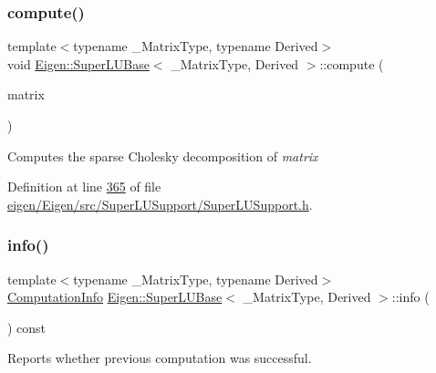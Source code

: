 \subsubsection{\texorpdfstring{compute()}{compute()}\hspace{0.1cm}{\footnotesize\ttfamily [2/2]}}
{\footnotesize\ttfamily template$<$typename \+\_\+\+Matrix\+Type, typename Derived$>$ \\
void \hyperlink{class_eigen_1_1_super_l_u_base}{Eigen\+::\+Super\+L\+U\+Base}$<$ \+\_\+\+Matrix\+Type, Derived $>$\+::compute (\begin{DoxyParamCaption}\item[{const Matrix\+Type \&}]{matrix }\end{DoxyParamCaption})\hspace{0.3cm}{\ttfamily [inline]}}

Computes the sparse Cholesky decomposition of {\itshape matrix} 

Definition at line \hyperlink{eigen_2_eigen_2src_2_super_l_u_support_2_super_l_u_support_8h_source_l00365}{365} of file \hyperlink{eigen_2_eigen_2src_2_super_l_u_support_2_super_l_u_support_8h_source}{eigen/\+Eigen/src/\+Super\+L\+U\+Support/\+Super\+L\+U\+Support.\+h}.

\mbox{\label{class_eigen_1_1_super_l_u_base_aa67da5c8c24110931c949c5896c5ec03}} 
\subsubsection{\texorpdfstring{info()}{info()}\hspace{0.1cm}{\footnotesize\ttfamily [1/2]}}
{\footnotesize\ttfamily template$<$typename \+\_\+\+Matrix\+Type, typename Derived$>$ \\
\hyperlink{group__enums_ga85fad7b87587764e5cf6b513a9e0ee5e}{Computation\+Info} \hyperlink{class_eigen_1_1_super_l_u_base}{Eigen\+::\+Super\+L\+U\+Base}$<$ \+\_\+\+Matrix\+Type, Derived $>$\+::info (\begin{DoxyParamCaption}{ }\end{DoxyParamCaption}) const\hspace{0.3cm}{\ttfamily [inline]}}



Reports whether previous computation was successful. 

